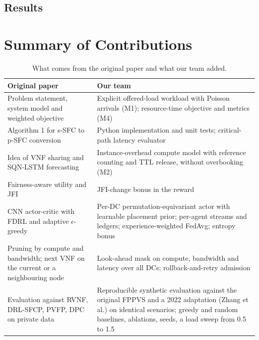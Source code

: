 \documentclass[11pt,a4paper]{article}
\begin{document}
\subsection{Results}



\section*{Summary of Contributions}

\begin{table}[H]
\centering\small
\caption{What comes from the original paper and what our team added.}
\label{tab:contrib}
\begin{tabularx}{\linewidth}{>{\raggedright\arraybackslash}X >{\raggedright\arraybackslash}X}
\toprule
Original paper~\cite{fppvs} & Our team \\
\midrule
Problem statement, system model and weighted objective & Explicit offered-load workload with Poisson arrivals (M1); resource-time objective and metrics (M4) \\
Algorithm 1 for s-SFC to p-SFC conversion & Python implementation and unit tests; critical-path latency evaluator \\
Idea of VNF sharing and SQN-LSTM forecasting & Instance-overhead compute model with reference counting and TTL release, without overbooking (M2) \\
Fairness-aware utility and JFI & JFI-change bonus in the reward \\
CNN actor-critic with FDRL and adaptive $\epsilon$-greedy & Per-DC permutation-equivariant actor with learnable placement prior; per-agent streams and ledgers; experience-weighted FedAvg; entropy bonus \\
Pruning by compute and bandwidth; next VNF on the current or a neighbouring node & Look-ahead mask on compute, bandwidth and latency over all DCs; rollback-and-retry admission \\
Evaluation against RVNF, DRL-SFCP, PVFP, DPC on private data & Reproducible synthetic evaluation against the original FPPVS and a 2022 adaptation (Zhang et al.) on identical scenarios; greedy and random baselines, ablations, \numSeeds{} seeds, a load sweep from 0.5 to 1.5 \\
\bottomrule
\end{tabularx}
\end{table}
\end{document}
